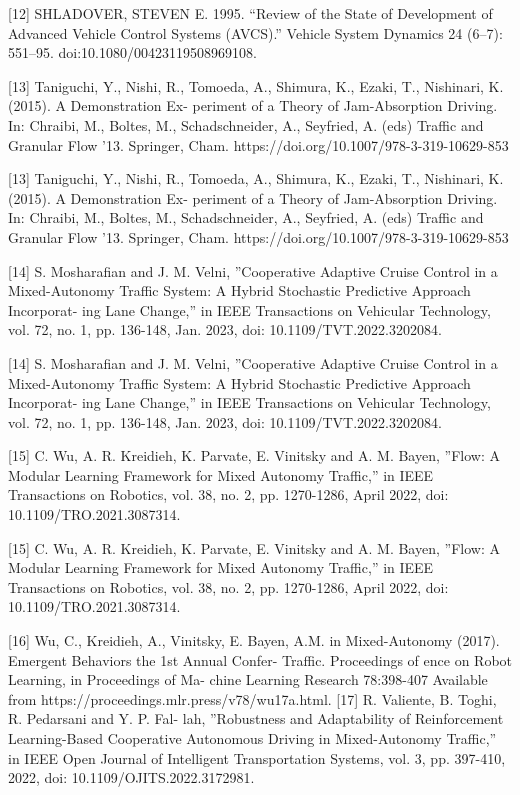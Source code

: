 \documentclass[12pt]{article}
\begin{document}
[12] SHLADOVER, STEVEN E. 1995. “Review of the State
of Development of Advanced Vehicle Control Systems
(AVCS).” Vehicle System Dynamics 24 (6–7): 551–95.
doi:10.1080/00423119508969108.


[13] Taniguchi, Y., Nishi, R., Tomoeda, A., Shimura, K.,
Ezaki, T., Nishinari, K. (2015). A Demonstration Ex-
periment of a Theory of Jam-Absorption Driving. In:
Chraibi, M., Boltes, M., Schadschneider, A., Seyfried,
A. (eds) Traffic and Granular Flow ’13. Springer,
Cham. https://doi.org/10.1007/978-3-319-10629-853


[13] Taniguchi, Y., Nishi, R., Tomoeda, A., Shimura, K.,
Ezaki, T., Nishinari, K. (2015). A Demonstration Ex-
periment of a Theory of Jam-Absorption Driving. In:
Chraibi, M., Boltes, M., Schadschneider, A., Seyfried,
A. (eds) Traffic and Granular Flow ’13. Springer,
Cham. https://doi.org/10.1007/978-3-319-10629-853


[14] S. Mosharafian and J. M. Velni, ”Cooperative Adaptive
Cruise Control in a Mixed-Autonomy Traffic System:
A Hybrid Stochastic Predictive Approach Incorporat-
ing Lane Change,” in IEEE Transactions on Vehicular
Technology, vol. 72, no. 1, pp. 136-148, Jan. 2023, doi:
10.1109/TVT.2022.3202084.


[14] S. Mosharafian and J. M. Velni, ”Cooperative Adaptive
Cruise Control in a Mixed-Autonomy Traffic System:
A Hybrid Stochastic Predictive Approach Incorporat-
ing Lane Change,” in IEEE Transactions on Vehicular
Technology, vol. 72, no. 1, pp. 136-148, Jan. 2023, doi:
10.1109/TVT.2022.3202084.


[15] C. Wu, A. R. Kreidieh, K. Parvate, E. Vinitsky and
A. M. Bayen, ”Flow: A Modular Learning Framework
for Mixed Autonomy Traffic,” in IEEE Transactions on
Robotics, vol. 38, no. 2, pp. 1270-1286, April 2022, doi:
10.1109/TRO.2021.3087314.


[15] C. Wu, A. R. Kreidieh, K. Parvate, E. Vinitsky and
A. M. Bayen, ”Flow: A Modular Learning Framework
for Mixed Autonomy Traffic,” in IEEE Transactions on
Robotics, vol. 38, no. 2, pp. 1270-1286, April 2022, doi:
10.1109/TRO.2021.3087314.


[16] Wu, C., Kreidieh, A., Vinitsky, E. Bayen, A.M.
in Mixed-Autonomy
(2017). Emergent Behaviors
the 1st Annual Confer-
Traffic. Proceedings of
ence on Robot Learning,
in Proceedings of Ma-
chine Learning Research 78:398-407 Available from
https://proceedings.mlr.press/v78/wu17a.html.
[17] R. Valiente, B. Toghi, R. Pedarsani and Y. P. Fal-
lah, ”Robustness and Adaptability of Reinforcement
Learning-Based Cooperative Autonomous Driving in
Mixed-Autonomy Traffic,” in IEEE Open Journal of
Intelligent Transportation Systems, vol. 3, pp. 397-410,
2022, doi: 10.1109/OJITS.2022.3172981.
\end{document}
